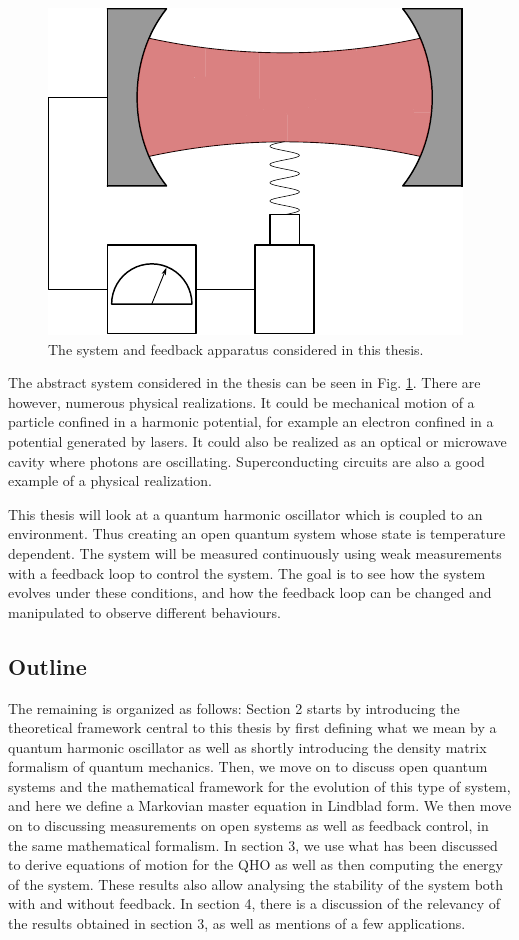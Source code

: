 \begin{figure}
    \centering
    \includegraphics[]{figures/systemFirstVersion.pdf}
    \caption{The system and feedback apparatus considered in this thesis.}
    \label{fig:system}
\end{figure}

The abstract system considered in the thesis can be seen in Fig. \ref{fig:system}. There are however, numerous physical realizations. It could be mechanical motion of a particle confined in a harmonic potential, for example an electron confined in a potential generated by lasers. It could also be realized as an optical or microwave cavity where photons are oscillating. Superconducting circuits are also a good example of a physical realization.

This thesis will look at a quantum harmonic oscillator which is coupled to an environment. Thus creating an open quantum system whose state is temperature dependent. The system will be measured continuously using weak measurements with a feedback loop to control the system. The goal is to see how the system evolves under these conditions, and how the feedback loop can be changed and manipulated to observe different behaviours.

\subsection{Outline}
The remaining is organized as follows: Section 2 starts by introducing the theoretical framework central to this thesis by first defining what we mean by a quantum harmonic oscillator as well as shortly introducing the density matrix formalism of quantum mechanics. Then, we move on to discuss open quantum systems and the mathematical framework for the evolution of this type of system, and here we define a Markovian master equation in Lindblad form. We then move on to discussing measurements on open systems as well as feedback control, in the same mathematical formalism. In section 3, we use what has been discussed to derive equations of motion for the QHO as well as then computing the energy of the system. These results also allow analysing the stability of the system both with and without feedback. In section 4, there is a discussion of the relevancy of the results obtained in section 3, as well as mentions of a few applications.



